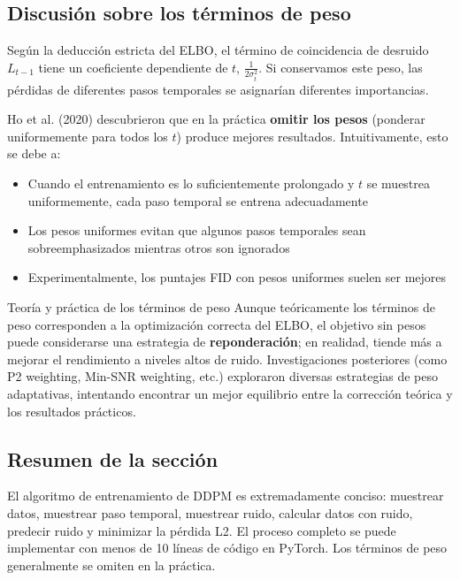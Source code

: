 \documentclass[a4paper]{article}
\begin{document}
\subsection{Discusión sobre los términos de peso}

Según la deducción estricta del ELBO, el término de coincidencia de desruido $L_{t-1}$ tiene un coeficiente dependiente de $t$, $\frac{1}{2\sigma_t^2}$. Si conservamos este peso, las pérdidas de diferentes pasos temporales se asignarían diferentes importancias.

Ho et al. (2020) descubrieron que en la práctica \textbf{omitir los pesos} (ponderar uniformemente para todos los $t$) produce mejores resultados. Intuitivamente, esto se debe a:

\begin{itemize}
    \item Cuando el entrenamiento es lo suficientemente prolongado y $t$ se muestrea uniformemente, cada paso temporal se entrena adecuadamente
    \item Los pesos uniformes evitan que algunos pasos temporales sean sobreemphasizados mientras otros son ignorados
    \item Experimentalmente, los puntajes FID con pesos uniformes suelen ser mejores
\end{itemize}

\begin{knowledgebox}{Teoría y práctica de los términos de peso}
Aunque teóricamente los términos de peso corresponden a la optimización correcta del ELBO, el objetivo sin pesos puede considerarse una estrategia de \textbf{reponderación}; en realidad, tiende más a mejorar el rendimiento a niveles altos de ruido. Investigaciones posteriores (como P2 weighting, Min-SNR weighting, etc.) exploraron diversas estrategias de peso adaptativas, intentando encontrar un mejor equilibrio entre la corrección teórica y los resultados prácticos.
\end{knowledgebox}

\subsection{Resumen de la sección}

El algoritmo de entrenamiento de DDPM es extremadamente conciso: muestrear datos, muestrear paso temporal, muestrear ruido, calcular datos con ruido, predecir ruido y minimizar la pérdida L2. El proceso completo se puede implementar con menos de 10 líneas de código en PyTorch. Los términos de peso generalmente se omiten en la práctica.
\end{document}
